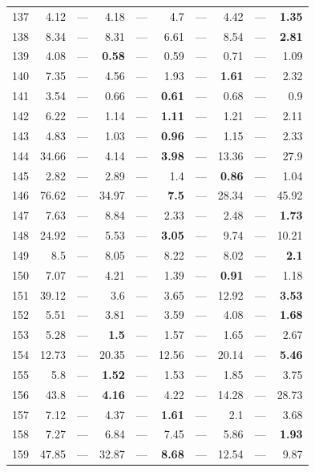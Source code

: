 \begin{longtable}{lr@{\hskip 4pt}l@{\hskip 12pt}r@{\hskip 4pt}l@{\hskip 12pt}r@{\hskip 4pt}l@{\hskip 12pt}r@{\hskip 4pt}l@{\hskip 12pt}r}
137 & 4.12 & --- & 4.18 & --- & 4.7 & --- & 4.42 & --- & \textbf{1.35} \\
138 & 8.34 & --- & 8.31 & --- & 6.61 & --- & 8.54 & --- & \textbf{2.81} \\
139 & 4.08 & --- & \textbf{0.58} & --- & 0.59 & --- & 0.71 & --- & 1.09 \\
140 & 7.35 & --- & 4.56 & --- & 1.93 & --- & \textbf{1.61} & --- & 2.32 \\
141 & 3.54 & --- & 0.66 & --- & \textbf{0.61} & --- & 0.68 & --- & 0.9 \\
142 & 6.22 & --- & 1.14 & --- & \textbf{1.11} & --- & 1.21 & --- & 2.11 \\
143 & 4.83 & --- & 1.03 & --- & \textbf{0.96} & --- & 1.15 & --- & 2.33 \\
144 & 34.66 & --- & 4.14 & --- & \textbf{3.98} & --- & 13.36 & --- & 27.9 \\
145 & 2.82 & --- & 2.89 & --- & 1.4 & --- & \textbf{0.86} & --- & 1.04 \\
146 & 76.62 & --- & 34.97 & --- & \textbf{7.5} & --- & 28.34 & --- & 45.92 \\
147 & 7.63 & --- & 8.84 & --- & 2.33 & --- & 2.48 & --- & \textbf{1.73} \\
148 & 24.92 & --- & 5.53 & --- & \textbf{3.05} & --- & 9.74 & --- & 10.21 \\
149 & 8.5 & --- & 8.05 & --- & 8.22 & --- & 8.02 & --- & \textbf{2.1} \\
150 & 7.07 & --- & 4.21 & --- & 1.39 & --- & \textbf{0.91} & --- & 1.18 \\
151 & 39.12 & --- & 3.6 & --- & 3.65 & --- & 12.92 & --- & \textbf{3.53} \\
152 & 5.51 & --- & 3.81 & --- & 3.59 & --- & 4.08 & --- & \textbf{1.68} \\
153 & 5.28 & --- & \textbf{1.5} & --- & 1.57 & --- & 1.65 & --- & 2.67 \\
154 & 12.73 & --- & 20.35 & --- & 12.56 & --- & 20.14 & --- & \textbf{5.46} \\
155 & 5.8 & --- & \textbf{1.52} & --- & 1.53 & --- & 1.85 & --- & 3.75 \\
156 & 43.8 & --- & \textbf{4.16} & --- & 4.22 & --- & 14.28 & --- & 28.73 \\
157 & 7.12 & --- & 4.37 & --- & \textbf{1.61} & --- & 2.1 & --- & 3.68 \\
158 & 7.27 & --- & 6.84 & --- & 7.45 & --- & 5.86 & --- & \textbf{1.93} \\
159 & 47.85 & --- & 32.87 & --- & \textbf{8.68} & --- & 12.54 & --- & 9.87 \\

\end{longtable}
